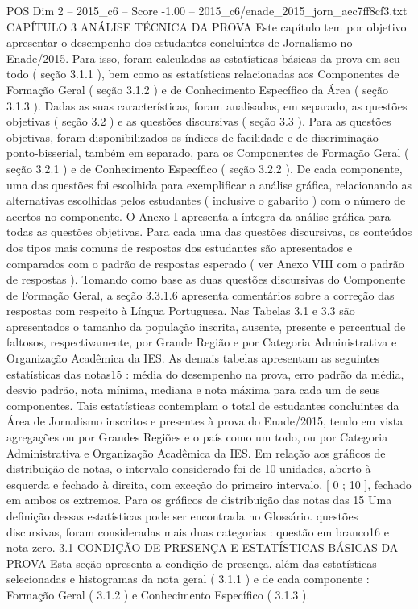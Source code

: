 \begin{textsample}{POS Dim 2 – 2015\_c6 – Score -1.00 – 2015\_c6/enade\_2015\_jorn\_aec7ff8cf3.txt}  \label{ex:f2_pos_237}
CAPÍTULO 3 ANÁLISE TÉCNICA DA PROVA Este capítulo tem por objetivo apresentar o desempenho dos estudantes concluintes de Jornalismo no Enade/2015.
Para isso, foram calculadas as estatísticas básicas da prova em seu todo ( seção 3.1.1 ), bem como as estatísticas relacionadas aos Componentes de Formação Geral ( seção 3.1.2 ) e de Conhecimento Específico da Área ( seção 3.1.3 ).
Dadas as suas características, foram analisadas, em separado, as questões objetivas ( seção 3.2 ) e as questões discursivas ( seção 3.3 ).
Para as questões objetivas, foram disponibilizados os índices de facilidade e de discriminação ponto-bisserial, também em separado, para os Componentes de Formação Geral ( seção 3.2.1 ) e de Conhecimento Específico ( seção 3.2.2 ).
De cada componente, uma das questões foi escolhida para exemplificar a análise gráfica, relacionando as alternativas escolhidas pelos estudantes ( inclusive o gabarito ) com o número de acertos no componente.
O Anexo I apresenta a íntegra da análise gráfica para todas as questões objetivas.
Para cada uma das questões discursivas, os conteúdos dos tipos mais comuns de respostas dos estudantes são apresentados e comparados com o padrão de respostas esperado ( ver Anexo VIII com o padrão de respostas ).
Tomando como base as duas questões discursivas do Componente de Formação Geral, a seção 3.3.1.6 apresenta comentários sobre a correção das respostas com respeito à Língua Portuguesa.
Nas Tabelas 3.1 e 3.3 são apresentados o tamanho da população inscrita, ausente, presente e percentual de faltosos, respectivamente, por Grande Região e por Categoria Administrativa e Organização Acadêmica da IES.
As demais tabelas apresentam as seguintes estatísticas das notas15 : média do desempenho na prova, erro padrão da média, desvio padrão, nota mínima, mediana e nota máxima para cada um de seus componentes.
Tais estatísticas contemplam o total de estudantes concluintes da Área de Jornalismo inscritos e presentes à prova do Enade/2015, tendo em vista agregações ou por Grandes Regiões e o país como um todo, ou por Categoria Administrativa e Organização Acadêmica da IES.
Em relação aos gráficos de distribuição de notas, o intervalo considerado foi de 10 unidades, aberto à esquerda e fechado à direita, com exceção do primeiro intervalo, [ 0 ; 10 ], fechado em ambos os extremos.
Para os gráficos de distribuição das notas das 15 Uma definição dessas estatísticas pode ser encontrada no Glossário. questões discursivas, foram consideradas mais duas categorias : questão em branco16 e nota zero. 3.1 CONDIÇÃO DE PRESENÇA E ESTATÍSTICAS BÁSICAS DA PROVA Esta seção apresenta a condição de presença, além das estatísticas selecionadas e histogramas da nota geral ( 3.1.1 ) e de cada componente : Formação Geral ( 3.1.2 ) e Conhecimento Específico ( 3.1.3 ).

\end{textsample}
